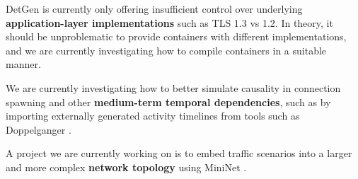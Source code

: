 \documentclass[runningheads]{llncs}
\begin{document}




DetGen is currently only offering insufficient control over underlying \textbf{application-layer implementations} such as TLS 1.3 vs 1.2. In theory, it should be unproblematic to provide containers with different implementations, and we are currently investigating how to compile containers in a suitable manner.

We are currently investigating how to better simulate causality in connection spawning and other \textbf{medium-term temporal dependencies}, such as by importing externally generated activity timelines from tools such as Doppelganger \cite{lin2019generating}. 

A project we are currently working on is to embed traffic scenarios into a larger and more complex \textbf{network topology} using MiniNet \cite{lantz2010network}.


\end{document}
